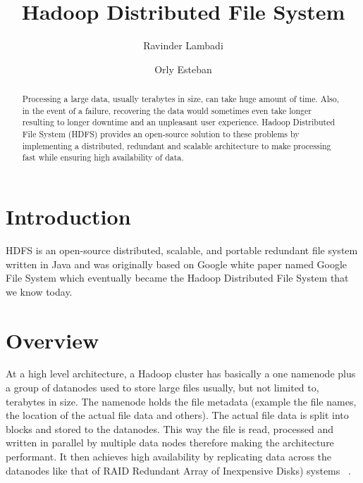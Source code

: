 
\title{Hadoop Distributed File System}

\author{Ravinder Lambadi}


\author{Orly Esteban}

\begin{abstract}
Processing a large data, usually terabytes in size, can take huge
amount of time. Also, in the event of a failure, recovering the
data would sometimes even take longer resulting to longer 
downtime and an unpleasant user experience. Hadoop Distributed
File System (HDFS) provides an open-source solution to these problems
by implementing a distributed, redundant and scalable architecture
to make processing fast while ensuring high availability of data.

\end{abstract}


\maketitle

\section{Introduction}

HDFS is an open-source distributed, scalable, and portable redundant
file system written in Java and was originally based on Google white
paper named Google File System which eventually became the Hadoop
Distributed File System that we know today.
 
\section{Overview}
 
At a high level architecture, a Hadoop cluster has basically a one
namenode plus a group of datanodes used to store large files usually,
but not limited to, terabytes in size. The namenode holds the file
metadata (example the file names, the location of the actual file data
and others). The actual file data is split into blocks and stored to
the datanodes. This way the file is read, processed and written in
parallel by multiple data nodes therefore making the architecture
performant. It then achieves high availability by replicating data
across the datanodes like that of RAID Redundant Array of Inexpensive
Disks) systems ~\cite{hid-sp18-506-hdfs}.


